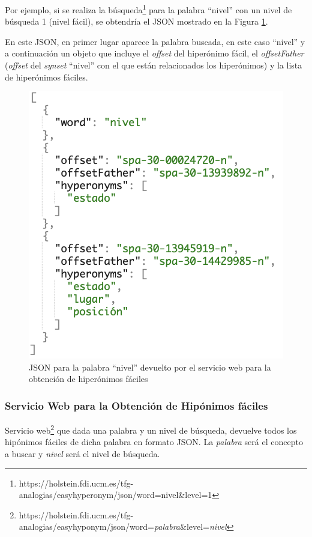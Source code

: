 Por ejemplo, si se realiza la búsqueda\footnote{https://holstein.fdi.ucm.es/tfg-analogias/easyhyperonym/json/word=nivel\&level=1} para la palabra ``nivel'' con un nivel de búsqueda 1 (nivel fácil), se obtendría el JSON mostrado en la Figura \ref{fig:peticionGetEasyHyperonym}.

 En este JSON, en primer lugar aparece la palabra buscada, en este caso ``nivel'' y a continuación un objeto que incluye el \textit{offset} del hiperónimo fácil, el \textit{offsetFather} (\textit{offset} del \textit{synset} ``nivel'' con el que están relacionados los hiperónimos) y la lista de hiperónimos fáciles.

\begin{figure}[!h]
	\includegraphics[width=.6\textwidth]{Imagenes/Bitmap/Capitulo4/JSON-SW/peticionGetEasyHyperonym.png}
	\centering
	\caption{JSON para la palabra ``nivel'' devuelto por el servicio web para la obtención de hiperónimos fáciles}
	\label{fig:peticionGetEasyHyperonym}
\end{figure}


\subsubsection{Servicio Web para la Obtención de Hipónimos fáciles}
\label{cap:subsec:sw_hiponimosfaciles}

Servicio web\footnote{https://holstein.fdi.ucm.es/tfg-analogias/easyhyponym/json/word=\textit{palabra}\&level=\textit{nivel}} que dada una palabra y un nivel de búsqueda, devuelve todos los hipónimos fáciles de dicha palabra en formato JSON. La \textit{palabra} será el concepto a buscar y \textit{nivel} será el nivel de búsqueda.

